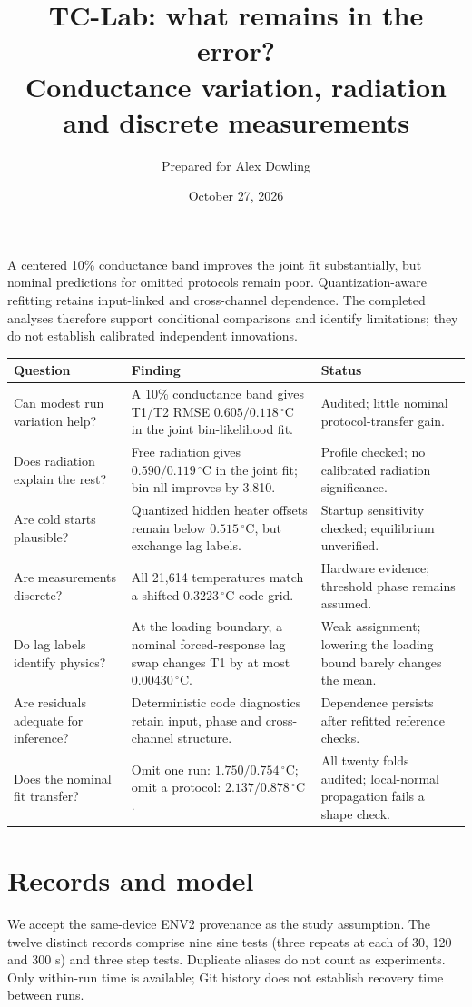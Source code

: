 \documentclass[10pt,letterpaper]{article}
\title{\vspace{-1.5em}TC-Lab: what remains in the error?\\
 \large Conductance variation, radiation and discrete measurements}
\author{Prepared for Alex Dowling}\date{October 27, 2026}
\newcommand{\C}{\,^\circ\mathrm{C}}
\begin{document}
\maketitle\vspace{-1em}
A centered 10\% conductance band improves the joint fit substantially, but
nominal predictions for omitted protocols remain poor. Quantization-aware
refitting retains input-linked and cross-channel dependence. The completed
analyses therefore support conditional comparisons and identify limitations;
they do not establish calibrated independent innovations.

\begin{tabularx}{\linewidth}{@{}>{\raggedright\arraybackslash}p{1.02in}>{\raggedright\arraybackslash}X>{\raggedright\arraybackslash}X@{}}
\toprule
Question & Finding & Status\\
\midrule
Can modest run variation help? & A 10\% conductance band gives T1/T2
RMSE $0.605/0.118\C$ in the joint bin-likelihood fit. &
Audited; little nominal protocol-transfer gain.\\
Does radiation explain the rest? & Free radiation gives
$0.590/0.119\C$ in the joint fit; bin nll improves by 3.810. &
Profile checked; no calibrated radiation significance.\\
Are cold starts plausible? & Quantized hidden heater offsets remain below
$0.515\C$, but exchange lag labels. &
Startup sensitivity checked; equilibrium unverified.\\
Are measurements discrete? & All 21,614 temperatures match a shifted
$0.3223\C$ code grid. & Hardware evidence; threshold phase remains assumed.\\
Do lag labels identify physics? & At the loading boundary, a nominal
forced-response lag swap changes T1 by at most $0.00430\C$. &
Weak assignment; lowering the loading bound barely changes the mean.\\
Are residuals adequate for inference? & Deterministic code diagnostics retain
input, phase and cross-channel structure. & Dependence persists after refitted reference checks.\\
Does the nominal fit transfer? & Omit one run: $1.750/0.754\C$;
omit a protocol: $2.137/0.878\C$. & All twenty folds audited; local-normal propagation fails a shape check.\\
\bottomrule
\end{tabularx}

\section{Records and model}
We accept the same-device ENV2 provenance as the study assumption. The twelve
distinct records comprise nine sine tests (three repeats at each of 30, 120
and 300 s) and three step tests. Duplicate aliases do not count as experiments.
Only within-run time is available; Git history does not establish recovery
time between runs.
\end{document}
